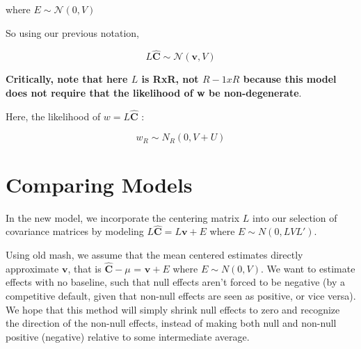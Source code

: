 \documentclass[11pt, oneside]{article}   	%
\newcommand{\Norm}{{\mathcal{N}}} %
\newcommand{\chat}{\bm{\hat{C}}}
\newcommand{\vb}{\bm{v}}
\begin{document}
\begin{itemize}
where $E \sim \Norm (0, V)$

So using our previous notation, 

\begin{equation}
\label{mashlik}
L \chat \sim \Norm(\vb,V)
\end{equation}


\textbf{Critically, note that here $L$ is RxR, not $R-1 x R$ because this model does not require that the likelihood of w be non-degenerate}. 

Here, the likelihood of $w = L \chat$ :

\begin{equation}
\label{\mashlik}
w_{R}  \sim N_{R} (0, V + U)
\end{equation}



\section{Comparing Models}


In the new model, we incorporate the centering matrix $L$ into our selection of covariance matrices by modeling $L\chat = L \vb + E$ where $E \sim N(0,LVL')$. \

Using old mash, we assume that the mean centered estimates directly approximate $\vb$, that is $\chat-\mu$ = $\vb + E$ where $E \sim N(0,V)$. 
We want to estimate effects with no baseline, such that null effects aren't forced to be negative (by a competitive default, given that non-null effects are seen as positive, or vice versa). We hope that this method will simply shrink null effects to zero and recognize the direction of the non-null effects, instead of making both null and non-null positive (negative) relative to some intermediate average.



\end{itemize}
\end{document}

